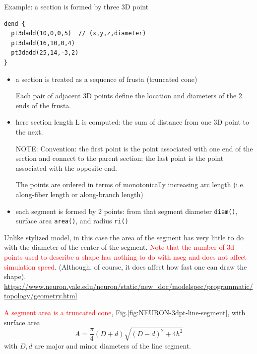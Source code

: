 Example: a section is formed by three 3D point
\begin{verbatim}
dend {
  pt3dadd(10,0,0,5)  // (x,y,z,diameter)
  pt3dadd(16,10,0,4)
  pt3dadd(25,14,-3,2)
}
\end{verbatim}
\begin{itemize}
  \item a section is treated as a sequence of frusta (truncated cone)
  
Each pair of adjacent 3D points define the location and diameters of the 2 ends
of the frusta.
  
  \item here section length L is computed: the sum of distance from one 3D point
  to the next.
  
NOTE: Convention: the first point is the point associated with one end of the
section and connect to the parent section; the last point is the point
associated with the opposite end.

The points are ordered in terms of monotonically increasing arc length (i.e.
along-fiber length or along-branch length)

  \item each segment is formed by 2 points: from that segment diameter
  \verb!diam()!, surface area \verb!area()!, and radius \verb!ri()!
\end{itemize}


Unlike stylized model, in this case the area of the segment has very little to
do with the diameter of the center of the segment.
\textcolor{red}{Note that the number of 3d points used to describe a shape has
nothing to do with nseg and does not affect simulation speed}. (Although, of
course, it does affect how fast one can draw the shape).
\url{https://www.neuron.yale.edu/neuron/static/new_doc/modelspec/programmatic/topology/geometry.html}

\textcolor{red}{A segment area is a truncated cone},
Fig.\ref{fig:NEURON-3dpt-line-segment}, with surface area
\begin{equation}
A = \frac{\pi}{4} (D+d) \sqrt{(D-d)^2 + 4 h^2}
\end{equation}
with $D, d$ are major and minor diameters of the line segment.

